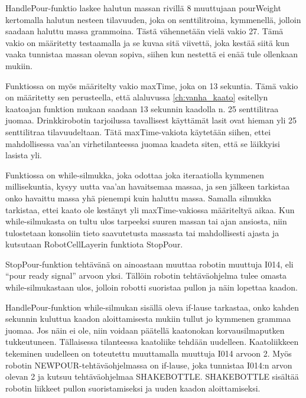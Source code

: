 HandlePour\hyp{}funktio laskee halutun massan rivillä 8 muuttujaan pourWeight kertomalla halutun nesteen tilavuuden, joka on senttilitroina, kymmenellä, jolloin saadaan haluttu massa grammoina. Tästä vähennetään vielä vakio 27. Tämä vakio on määritetty testaamalla ja se kuvaa sitä viivettä, joka kestää siitä kun vaaka tunnistaa massan olevan sopiva, siihen kun nestettä ei enää tule ollenkaan mukiin.

Funktiossa on myös määritelty vakio maxTime, joka on 13 sekuntia. Tämä vakio on määritetty sen perusteella, että alaluvussa \ref{ch:vanha_kaato} esitellyn kaatoajan funktion mukaan saadaan 13 sekunnin kaadolla n. 25 senttilitraa juomaa. Drinkkirobotin tarjoilussa tavallisest käyttämät lasit ovat hieman yli 25 senttilitraa tilavuudeltaan. Tätä maxTime-vakiota käytetään siihen, ettei mahdollisessa vaa'an virhetilanteessa juomaa kaadeta siten, että se läikkyisi lasista yli.

Funktiossa on while-silmukka, joka odottaa joka iteraatiolla kymmenen millisekuntia, kysyy uutta vaa'an havaitsemaa massaa, ja sen jälkeen tarkistaa onko havaittu massa yhä pienempi kuin haluttu massa. Samalla silmukka tarkistaa, ettei kaato ole kestänyt yli maxTime-vakiossa määriteltyä aikaa. Kun while-silmukasta on tultu ulos tarpeeksi suuren massan tai ajan ansiosta, niin tulostetaan konsoliin tieto saavutetusta massasta tai mahdollisesti ajasta ja kutsutaan RobotCellLayerin funktiota StopPour.

StopPour-funktion tehtävänä on ainoastaan muuttaa robotin muuttuja I014, eli ``pour ready signal'' arvoon yksi. Tällöin robotin tehtäväohjelma tulee omasta while-silmukastaan ulos, jolloin robotti suoristaa pullon ja näin lopettaa kaadon.

HandlePour-funktion while-silmukan sisällä oleva if-lause tarkastaa, onko kahden sekunnin kuluttua kaadon aloittamisesta mukiin tullut jo kymmenen grammaa juomaa. Jos näin ei ole, niin voidaan päätellä kaatonokan korvausilmaputken tukkeutuneen. Tällaisessa tilanteessa kaatoliike tehdään uudelleen. Kaatoliikkeen tekeminen uudelleen on toteutettu muuttamalla muuttuja I014 arvoon 2. Myös robotin NEWPOUR-tehtäväohjelmassa on if-lause, joka tunnistaa I014:n arvon olevan 2 ja kutsuu tehtäväohjelmaa SHAKEBOTTLE. SHAKEBOTTLE sisältää robotin liikkeet pullon suoristamiseksi ja uuden kaadon aloittamiseksi.

\newpage

